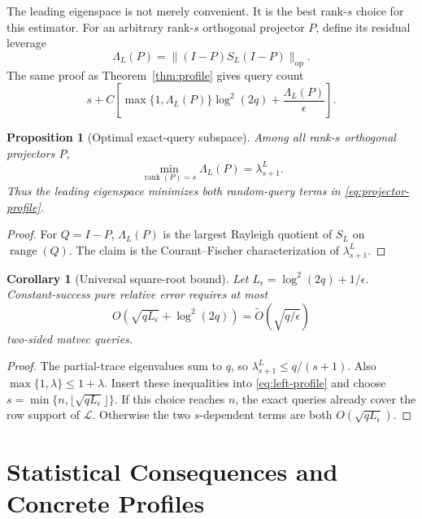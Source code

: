 \documentclass[twoside]{article}
\newtheorem{proposition}[theorem]{Proposition}
\newtheorem{corollary}[theorem]{Corollary}
\newcommand{\rank}{\operatorname{rank}}
\newcommand{\op}{\mathrm{op}}
\newcommand{\cL}{\mathcal L}
\begin{document}
The leading eigenspace is not merely convenient. It is the best rank-$s$ choice for this estimator. For an arbitrary rank-$s$ orthogonal projector $P$, define its residual leverage
\begin{equation}
 \Lambda_L(P)=\|(I-P)S_L(I-P)\|_\op.
 \label{eq:projector-leverage}
\end{equation}
The same proof as Theorem~\ref{thm:profile} gives query count
\begin{equation}
 s+C\left[
 \max\{1,\Lambda_L(P)\}\log^2(2q)
 +\frac{\Lambda_L(P)}{\epsilon}
 \right].
 \label{eq:projector-profile}
\end{equation}

\begin{proposition}[Optimal exact-query subspace]
\label{prop:optimal-projector}
Among all rank-$s$ orthogonal projectors $P$, \[ \min_{\rank(P)=s}\Lambda_L(P)=\lambda_{s+1}^L. \] Thus the leading eigenspace minimizes both random-query terms in \eqref{eq:projector-profile}.
\end{proposition}

\begin{proof}
For $Q=I-P$, $\Lambda_L(P)$ is the largest Rayleigh quotient of $S_L$ on $\operatorname{range}(Q)$. The claim is the Courant--Fischer characterization of $\lambda_{s+1}^L$.
\end{proof}

\begin{corollary}[Universal square-root bound]
\label{cor:universal}
Let $L_\epsilon=\log^2(2q)+1/\epsilon$. Constant-success pure relative error requires at most
\begin{equation}
 O\!\left(\sqrt{qL_\epsilon}+\log^2(2q)\right)
 =\widetilde O\!\left(\sqrt{q/\epsilon}\right)
 \label{eq:universal}
\end{equation}
two-sided matvec queries.
\end{corollary}

\begin{proof}
The partial-trace eigenvalues sum to $q$, so $\lambda_{s+1}^L\le q/(s+1)$. Also $\max\{1,\lambda\}\le1+\lambda$. Insert these inequalities into \eqref{eq:left-profile} and choose $s=\min\{n,\lfloor\sqrt{qL_\epsilon}\rfloor\}$. If this choice reaches $n$, the exact queries already cover the row support of $\cL$. Otherwise the two $s$-dependent terms are both $O(\sqrt{qL_\epsilon})$.
\end{proof}

\section{Statistical Consequences and Concrete Profiles}
\label{sec:statistics}
\end{document}
